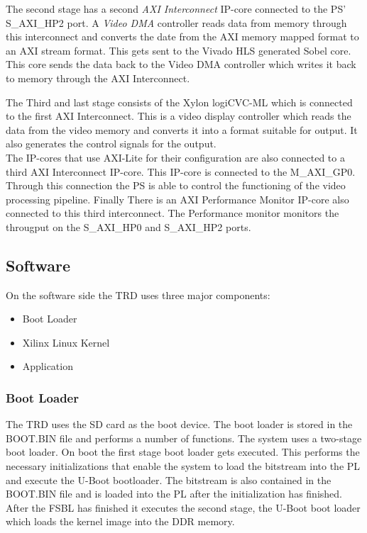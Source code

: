 The second stage has a second \emph{AXI Interconnect} IP-core connected to the PS' S\_AXI\_HP2 port. A \emph{Video DMA} controller reads data from memory through this interconnect and converts the date from the AXI memory mapped format to an AXI stream format. This gets sent to the Vivado HLS generated Sobel core. This core sends the data back to the Video DMA controller which writes it back to memory through the AXI Interconnect.


The Third and last stage consists of the Xylon logiCVC-ML which is connected to the first AXI Interconnect. This is a video display controller which reads the data from the video memory and converts it into a format suitable for output. It also generates the control signals for the output.\\
The IP-cores that use AXI-Lite for their configuration are also connected to a third AXI Interconnect IP-core. This IP-core is connected to the M\_AXI\_GP0. Through this connection the PS is able to control the functioning of the video processing pipeline. Finally There is an AXI Performance Monitor IP-core also connected to this third interconnect. The Performance monitor monitors the througput on the S\_AXI\_HP0 and S\_AXI\_HP2 ports. 


\subsection{Software}
On the software side the TRD uses three major components:
\begin{itemize}
	\item Boot Loader
	\item Xilinx Linux Kernel
	\item Application
\end{itemize}

\subsubsection{Boot Loader} The TRD uses the SD card as the boot device. The boot loader is stored in the BOOT.BIN file and performs a number of functions. The system uses a two-stage boot loader. On boot the first stage boot loader gets executed. This performs the necessary initializations that enable the system to load the bitstream into the PL and execute the U-Boot bootloader. The bitstream is also contained in the BOOT.BIN file and is loaded into the PL after the initialization has finished. After the FSBL has finished it executes the second stage, the U-Boot boot loader which loads the kernel image into the DDR memory.

